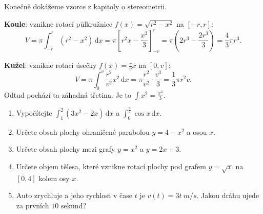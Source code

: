\begin{example}\label{ex:objem-koule}
  Konečně dokážeme vzorce z kapitoly o stereometrii.

  \textbf{Koule}: vznikne rotací půlkružnice $f(x) = \sqrt{r^2 - x^2}$ na $[-r, r]$:
  \begin{equation*}
    V = \pi\int_{-r}^{r}(r^2 - x^2)\,\mathrm{d}x = \pi{\left[r^2x - \frac{x^3}{3}\right]}_{-r}^{r} = \pi\left(2r^3 - \frac{2r^3}{3}\right) = \frac{4}{3}\pi r^3.
  \end{equation*}

  \textbf{Kužel}: vznikne rotací úsečky $f(x) = \frac{r}{v}x$ na $[0, v]$:
  \begin{equation*}
    V = \pi\int_0^v\frac{r^2}{v^2}x^2\,\mathrm{d}x = \pi\frac{r^2}{v^2}\cdot\frac{v^3}{3} = \frac{1}{3}\pi r^2v.
  \end{equation*}
  Odtud pochází ta záhadná třetina. Je to $\int x^2 = \frac{x^3}{3}$.

  \begin{center}
  \end{center}
\end{example}

\begin{problem}
  \begin{enumerate}[label=(\alph*)]
    \item Vypočítejte $\int_1^2(3x^2 - 2x)\,\mathrm{d}x$ a $\int_0^{\frac{\pi}{2}}\cos x\,\mathrm{d}x$.
    \item Určete obsah plochy ohraničené parabolou $y = 4 - x^2$ a osou $x$.
    \item Určete obsah plochy mezi grafy $y = x^2$ a $y = 2x + 3$.
    \item Určete objem tělesa, které vznikne rotací plochy pod grafem $y = \sqrt{x}$ na $[0, 4]$ kolem osy $x$.
    \item Auto zrychluje a jeho rychlost v čase $t$ je $v(t) = 3t\ \si{m/s}$. Jakou dráhu ujede za prvních $10$ sekund?
  \end{enumerate}
\end{problem}

